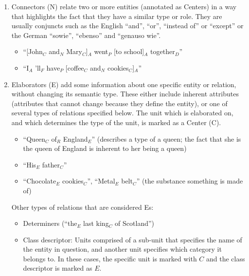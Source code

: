 \documentclass[11pt]{article}
\newcommand{\nss}[1]{{\color{magenta}{NSS: #1}}}
\begin{document}
\begin{enumerate}

\item
 {\sc Connectors} (N) relate two or more entities (annotated as Centers) in a way that 
 highlights the fact that they have a similar type or role.
 They are usually conjuncts such as the English ``and'', ``or'', ``instead of'' or ``except'' or the German ``sowie'', ``ebenso'' and ``genauso wie''.

  \begin{itemize}
  \item
    ``[John$_C$ and$_N$ Mary$_C$]$_A$ went$_P$ [to school]$_A$ together$_D$''
  \item
    ``I$_A$ 'll$_F$ have$_P$ [coffee$_C$ and$_N$ cookies$_C$]$_A$'' 
  \end{itemize}
  
\item
  {\sc Elaborators} (E) add some information about one specific entity or relation, without changing its semantic type. %
  These either include inherent attributes (attributes that cannot change 
  because they define the entity), or one of several types of relations specified 
  below. The unit which is elaborated on, and which determines the type of the 
  unit, is marked as a {\sc Center} (C).
  
  \begin{itemize}
    \item
      ``Queen$_C$ of$_R$ England$_E$'' (describes a type of a queen; the fact that she is the queen of England is inherent to her being a queen)
	\item
	  ``His$_E$ father$_C$''
	\item
      ``Chocolate$_E$ cookies$_C$'', ``Metal$_E$ belt$_C$'' (the substance something is made of)
  \end{itemize}
  
  Other types of relations that are considered Es:

  \begin{itemize}
  \item
    Determiners (``the$_E$ last king$_C$ of Scotland'')
  \item
    Class descriptor: Units comprised of a sub-unit that specifies the name of the entity in question,
    and another unit specifies which category it belongs to.
		In these cases, the specific unit is marked with $C$ and the class descriptor is marked as $E$.
		

\end{itemize}
\end{enumerate}
\end{document}
